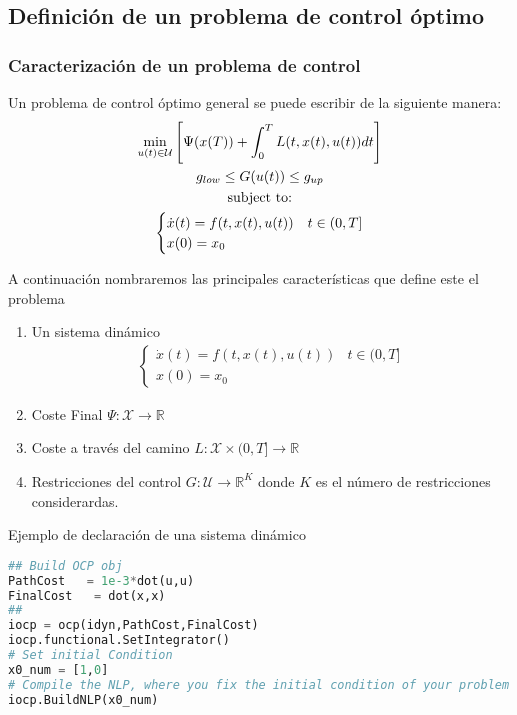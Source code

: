 \documentclass[]{article}
\begin{document}
\subsection{Definición de un problema de control óptimo}
\subsubsection{Caracterización de un problema de control}
Un problema de control óptimo general se puede escribir de la siguiente manera: 
\begin{gather}
    \min_{u(t)\in  \mathcal{U}} \Bigg[ \Psi(x(T)) + \int_0^T L(t,x(t),u(t))dt \Bigg] \\
    g_{low} \leq G(u(t)) \leq g_{up} \\
    \notag \text{subject to:} \\
    \begin{cases}
        \dot{x}(t) = f(t,x(t),u(t)) & t \in (0,T]\\
        x(0) = x_0
    \end{cases}  
\end{gather}

A continuación nombraremos las principales características que define este el problema

\begin{enumerate}
    \item Un sistema dinámico
     \begin{gather}
        \begin{cases}
            \dot{x}(t) = f(t,x(t),u(t)) & t \in (0,T]\\
            x(0) = x_0
            \end{cases}          
          \end{gather}

    \item Coste Final $\Psi:\mathcal{X} \rightarrow \mathbb{R}$
    \item Coste a través del camino $L:\mathcal{X} \times (0,T]\rightarrow \mathbb{R}$
    \item Restricciones del control $G:\mathcal{U} \rightarrow \mathbb{R}^K$ donde $K$ es el número de restricciones considerardas.
\end{enumerate}

\begin{algorithm}[ht!]
	\caption{Ejemplo de declaración de una sistema dinámico} \label{alg:coefficients_p2}
    \begin{lstlisting}[language=Python]
## Build OCP obj
PathCost   = 1e-3*dot(u,u)
FinalCost   = dot(x,x)
##
iocp = ocp(idyn,PathCost,FinalCost)
iocp.functional.SetIntegrator()
# Set initial Condition
x0_num = [1,0]
# Compile the NLP, where you fix the initial condition of your problem
iocp.BuildNLP(x0_num)
\end{lstlisting}
\end{algorithm} 
\end{document}
